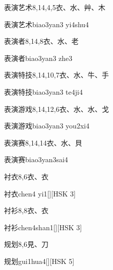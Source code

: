 \begin{entry}{表演艺术}{8,14,4,5}{⾐、⽔、⾋、⽊}
  \begin{phonetics}{表演艺术}{biao3yan3 yi4shu4}
  \end{phonetics}
\end{entry}

\begin{entry}{表演者}{8,14,8}{⾐、⽔、⽼}
  \begin{phonetics}{表演者}{biao3yan3 zhe3}
  \end{phonetics}
\end{entry}

\begin{entry}{表演特技}{8,14,10,7}{⾐、⽔、⽜、⼿}
  \begin{phonetics}{表演特技}{biao3yan3 te4ji4}
  \end{phonetics}
\end{entry}

\begin{entry}{表演游戏}{8,14,12,6}{⾐、⽔、⽔、⼽}
  \begin{phonetics}{表演游戏}{biao3yan3 you2xi4}
  \end{phonetics}
\end{entry}

\begin{entry}{表演赛}{8,14,14}{⾐、⽔、⾙}
  \begin{phonetics}{表演赛}{biao3yan3sai4}
  \end{phonetics}
\end{entry}

\begin{entry}{衬衣}{8,6}{⾐、⾐}
  \begin{phonetics}{衬衣}{chen4 yi1}[][HSK 3]
  \end{phonetics}
\end{entry}

\begin{entry}{衬衫}{8,8}{⾐、⾐}
  \begin{phonetics}{衬衫}{chen4shan1}[][HSK 3]
  \end{phonetics}
\end{entry}

\begin{entry}{规划}{8,6}{⾒、⼑}
  \begin{phonetics}{规划}{gui1hua4}[][HSK 5]
  \end{phonetics}
\end{entry}


